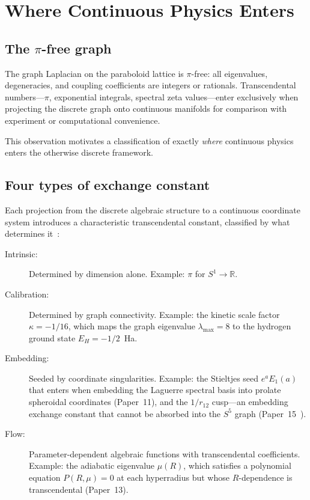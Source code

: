 \documentclass[aps,pra,twocolumn,superscriptaddress,longbibliography]{revtex4-2}
\begin{document}
\section{Where Continuous Physics Enters}
\label{sec:exchange}

\subsection{The $\pi$-free graph}

The graph Laplacian on the paraboloid lattice is $\pi$-free: all
eigenvalues, degeneracies, and coupling coefficients are integers or
rationals.  Transcendental numbers---$\pi$, exponential integrals,
spectral zeta values---enter exclusively when projecting the discrete
graph onto continuous manifolds for comparison with experiment or
computational convenience.

This observation motivates a classification of exactly
\textit{where} continuous physics enters the otherwise discrete
framework.

\subsection{Four types of exchange constant}

Each projection from the discrete algebraic structure to a continuous
coordinate system introduces a characteristic transcendental constant,
classified by what determines it~\cite{Paper18}:

\begin{description}
\item[Intrinsic:] Determined by dimension alone.  Example: $\pi$ for
  $S^1 \to \mathbb{R}$.

\item[Calibration:] Determined by graph connectivity.  Example: the
  kinetic scale factor $\kappa = -1/16$, which maps the graph
  eigenvalue $\lambda_{\max} = 8$ to the hydrogen ground state
  $E_H = -1/2$~Ha.

\item[Embedding:] Seeded by coordinate singularities.  Example: the
  Stieltjes seed $e^a E_1(a)$ that enters when embedding the Laguerre
  spectral basis into prolate spheroidal coordinates (Paper~11), and
  the $1/r_{12}$ cusp---an embedding exchange constant that cannot be
  absorbed into the $S^5$ graph
  (Paper~15~\cite{Paper15}).

\item[Flow:] Parameter-dependent algebraic functions with
  transcendental coefficients.  Example: the adiabatic eigenvalue
  $\mu(R)$, which satisfies a polynomial equation
  $P(R, \mu) = 0$ at each hyperradius but whose $R$-dependence is
  transcendental (Paper~13).
\end{description}
\end{document}
